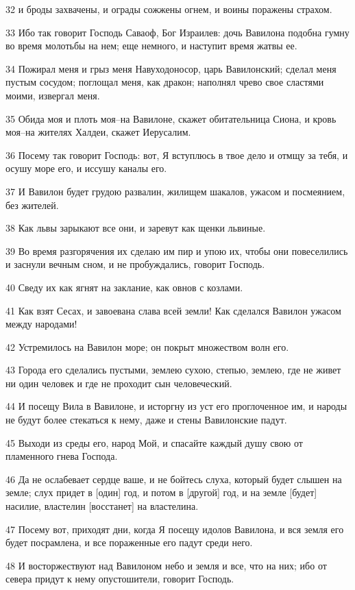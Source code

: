 \par 32 и броды захвачены, и ограды сожжены огнем, и воины поражены страхом.
\par 33 Ибо так говорит Господь Саваоф, Бог Израилев: дочь Вавилона подобна гумну во время молотьбы на нем; еще немного, и наступит время жатвы ее.
\par 34 Пожирал меня и грыз меня Навуходоносор, царь Вавилонский; сделал меня пустым сосудом; поглощал меня, как дракон; наполнял чрево свое сластями моими, извергал меня.
\par 35 Обида моя и плоть моя--на Вавилоне, скажет обитательница Сиона, и кровь моя--на жителях Халдеи, скажет Иерусалим.
\par 36 Посему так говорит Господь: вот, Я вступлюсь в твое дело и отмщу за тебя, и осушу море его, и иссушу каналы его.
\par 37 И Вавилон будет грудою развалин, жилищем шакалов, ужасом и посмеянием, без жителей.
\par 38 Как львы зарыкают все они, и заревут как щенки львиные.
\par 39 Во время разгорячения их сделаю им пир и упою их, чтобы они повеселились и заснули вечным сном, и не пробуждались, говорит Господь.
\par 40 Сведу их как ягнят на заклание, как овнов с козлами.
\par 41 Как взят Сесах, и завоевана слава всей земли! Как сделался Вавилон ужасом между народами!
\par 42 Устремилось на Вавилон море; он покрыт множеством волн его.
\par 43 Города его сделались пустыми, землею сухою, степью, землею, где не живет ни один человек и где не проходит сын человеческий.
\par 44 И посещу Вила в Вавилоне, и исторгну из уст его проглоченное им, и народы не будут более стекаться к нему, даже и стены Вавилонские падут.
\par 45 Выходи из среды его, народ Мой, и спасайте каждый душу свою от пламенного гнева Господа.
\par 46 Да не ослабевает сердце ваше, и не бойтесь слуха, который будет слышен на земле; слух придет в [один] год, и потом в [другой] год, и на земле [будет] насилие, властелин [восстанет] на властелина.
\par 47 Посему вот, приходят дни, когда Я посещу идолов Вавилона, и вся земля его будет посрамлена, и все пораженные его падут среди него.
\par 48 И восторжествуют над Вавилоном небо и земля и все, что на них; ибо от севера придут к нему опустошители, говорит Господь.
